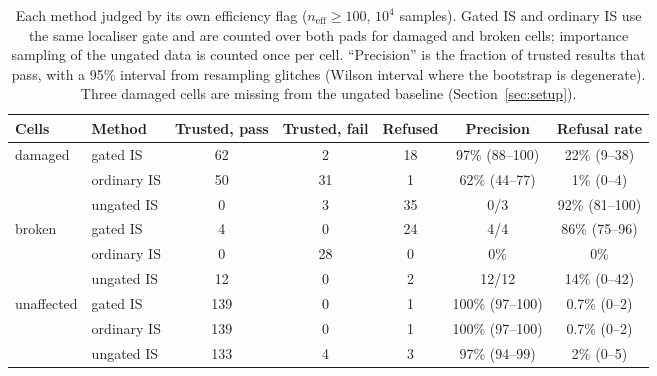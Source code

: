 \documentclass{openjournal}
\newcommand{\neff}{n_{\mathrm{eff}}}
\begin{document}
\begin{table}[t]
\centering
\caption{Each method judged by its own efficiency flag ($\neff\ge100$, $10^{4}$ samples).
Gated IS and ordinary IS use the same localiser gate and are counted over both pads for damaged and broken cells; importance sampling of the ungated data is counted once per cell.
``Precision'' is the fraction of trusted results that pass, with a 95\% interval from resampling glitches (Wilson interval where the bootstrap is degenerate).
Three damaged cells are missing from the ungated baseline (Section~\ref{sec:setup}).}
\label{tab:flags}
\footnotesize
\setlength{\tabcolsep}{4pt}
\begin{tabular}{@{}llccccc@{}}
\toprule
Cells & Method & Trusted, pass & Trusted, fail & Refused & Precision & Refusal rate \\
\midrule
damaged & gated IS & 62 & 2 & 18 & 97\% (88--100) & 22\% (9--38) \\
 & ordinary IS & 50 & 31 & 1 & 62\% (44--77) & 1\% (0--4) \\
 & ungated IS & 0 & 3 & 35 & 0/3 & 92\% (81--100) \\
\midrule
broken & gated IS & 4 & 0 & 24 & 4/4 & 86\% (75--96) \\
 & ordinary IS & 0 & 28 & 0 & 0\% & 0\% \\
 & ungated IS & 12 & 0 & 2 & 12/12 & 14\% (0--42) \\
\midrule
unaffected & gated IS & 139 & 0 & 1 & 100\% (97--100) & 0.7\% (0--2) \\
 & ordinary IS & 139 & 0 & 1 & 100\% (97--100) & 0.7\% (0--2) \\
 & ungated IS & 133 & 4 & 3 & 97\% (94--99) & 2\% (0--5) \\
\bottomrule
\end{tabular}
\end{table}
\end{document}
